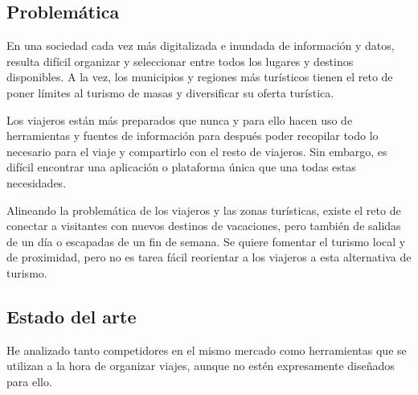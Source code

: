 \subsection{Problemática} 
En una sociedad cada vez más digitalizada e inundada de información y datos, resulta difícil organizar y seleccionar entre todos los lugares y destinos disponibles. A la vez, los municipios y regiones más turísticos tienen el reto de poner límites al turismo de masas y diversificar su oferta turística. 

Los viajeros están más preparados que nunca y para ello hacen uso de herramientas y fuentes de información para después poder recopilar todo lo necesario para el viaje y compartirlo con el resto de viajeros. Sin embargo, es difícil encontrar una aplicación o plataforma única que una todas estas necesidades. 

Alineando la problemática de los viajeros y las zonas turísticas, existe el reto de conectar a visitantes con nuevos destinos de vacaciones, pero también de salidas de un día o escapadas de un fin de semana. Se quiere fomentar el turismo local y de proximidad, pero no es tarea fácil reorientar a los viajeros a esta alternativa de turismo.

\subsection{Estado del arte} 
He analizado tanto competidores en el mismo mercado como herramientas que se utilizan a la hora de organizar viajes, aunque no estén expresamente diseñados para ello.

